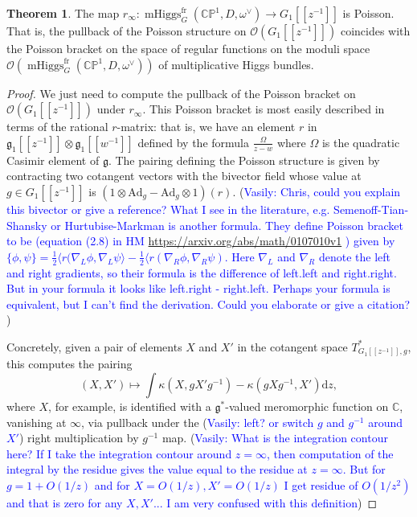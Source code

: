 \documentclass[11pt, oneside, reqno]{amsart}
\theoremstyle{definition} \newtheorem{definition}{Definition}[section]
\newtheorem{theorem}[definition]{Theorem}
\theoremstyle{definition} \newtheorem{remark}[definition]{Remark}
\theoremstyle{definition} \newtheorem{remarks}[definition]{Remarks}
\theoremstyle{definition} \newtheorem{question}[definition]{Question}
\theoremstyle{definition} \newtheorem*{note}{Note}
\theoremstyle{definition} \newtheorem{example}[definition]{Example}
\theoremstyle{definition} \newtheorem{examples}[definition]{Examples}
\renewcommand{\gg}{\mathfrak{g}}
\newcommand{\bb}[1]{\mathbb{#1}}
\newcommand{\mr}[1]{\mathrm{#1}}
\newcommand{\CC}{\mathbb{C}}
\newcommand{\OO}{\mathcal{O}}
\DeclareMathOperator{\mhiggs}{mHiggs}
\renewcommand{\d}{\mathrm{d}}
\newcommand{\fr}{\mathrm{fr}}
\newcommand{\Ad}{\mr{Ad}}
\newcommand{\vasily}[1]{(\textcolor{blue}{Vasily: #1})}
\begin{document}
\begin{theorem} \label{Poisson_Lie_Comparison_thm}
The map $r_\infty \colon \mhiggs^\fr_G(\bb{CP}^1,D,\omega^\vee) \to G_1[[z^{-1}]]$ is Poisson.  That is, the pullback of the Poisson structure on $\OO(G_1[[z^{-1}]])$ coincides with the Poisson bracket on the space of regular functions on the moduli space $\OO(\mhiggs^\fr_G(\bb{CP}^1,D,\omega^\vee))$ of multiplicative Higgs bundles. 
\end{theorem}

\begin{proof}
We just need to compute the pullback of the Poisson bracket on $\OO(G_1[[z^{-1}]])$ under $r_\infty$.  This Poisson bracket is most easily described in terms of the rational $r$-matrix: that is, we have an element $r$ in $\gg_1[[z^{-1}]] \otimes \gg_1[[w^{-1}]]$ defined by the formula $\frac \Omega {z-w}$ where $\Omega$ is the quadratic Casimir element of $\gg$.  The pairing defining the Poisson structure is given by contracting two cotangent vectors with the bivector field whose value at $g \in G_1[[z^{-1}]]$ is $(1 \otimes \Ad_g - \Ad_g \otimes 1)(r)$.
\vasily{Chris, could you explain this bivector or give a reference?
  What I see in the literature, e.g. Semenoff-Tian-Shansky or Hurtubise-Markman
  is another formula. They define Poisson bracket to be (equation (2.8) in HM
  \url{https://arxiv.org/abs/math/0107010v1} ) given by 
  $\{\phi, \psi \} = \frac 1 2  \langle r (\nabla_L \phi, \nabla_L\psi \rangle
  - \frac  1 2 \langle r (\nabla_R \phi, \nabla_R \psi) $. Here $\nabla_L$ and
  $\nabla_R$ denote the left and right gradients, so their formula 
is the difference of left.left  and right.right. But in your formula it looks
  like left.right - right.left. Perhaps your formula is equivalent, but I can't find
the derivation. Could you elaborate or give a citation? }

  Concretely, given a pair of elements $X$ and $X'$ in the cotangent space $T^*_{G_1[[z^{-1}]], g}$, this computes the pairing
\[(X, X') \mapsto \int \kappa(X, g X' g^{-1}) - \kappa(g X g^{-1},X')\d z,\]
where $X$, for example, is identified with a $\gg^*$-valued meromorphic function on $\CC$, vanishing at $\infty$, via pullback under the \vasily{left? or switch
$g$ and $g^{-1}$ around $X'$} right multiplication by $g^{-1}$ map.  
\vasily{What is the integration contour here? If I take the
  integration contour around $ z= \infty$, then computation
  of the integral by the residue gives the value equal
  to the residue at $ z = \infty$. But for $g = 1 + O(1/z)$ and for
  $X = O(1/z), X' = O(1/z)$ I get residue of $O(1/z^2)$ and that is zero
  for any $X, X'$... I am very confused with this definition}
  


\end{proof}
\end{document}
